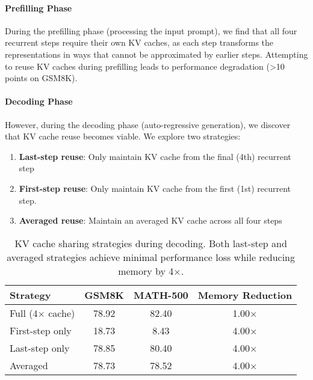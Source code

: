 \documentclass[]{bytedance_seed}
\newcommand{\1}{\mathbf{1}}
\begin{document}
\paragraph{Prefilling Phase}
During the prefilling phase (processing the input prompt), we find that all four recurrent steps require their own KV caches, as each step transforms the representations in ways that cannot be approximated by earlier steps. Attempting to reuse KV caches during prefilling leads to performance degradation (>10 points on GSM8K).

\paragraph{Decoding Phase}
However, during the decoding phase (auto-regressive generation), we discover that KV cache reuse becomes viable. We explore two strategies:

\begin{enumerate}
    \item \textbf{Last-step reuse}: Only maintain KV cache from the final (4th) recurrent step
    \item   \textbf{First-step reuse}: Only maintain KV cache from the first (1st) recurrent step. 
    \item \textbf{Averaged reuse}: Maintain an averaged KV cache across all four steps
   
\end{enumerate}

\begin{table}[htbp]
\centering
\caption{KV cache sharing strategies during decoding. Both last-step and averaged strategies achieve minimal performance loss while reducing memory by 4$\times$.}
\label{tab:kv_cache}
\small
\begin{tabular}{@{}lccc@{}}
\toprule
\textbf{Strategy} & \textbf{GSM8K} & \textbf{MATH-500} & \textbf{Memory Reduction}  \\
\midrule
Full (4$\times$ cache) & 78.92 & 82.40 & 1.00$\times$  \\
First-step only & 18.73 & 8.43 & 4.00$\times$  \\
Last-step only & 78.85 & 80.40 & 4.00$\times$  \\
Averaged & 78.73 & 78.52 & 4.00$\times$ \\
\bottomrule
\end{tabular}
\end{table}
\end{document}
